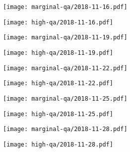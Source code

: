 \documentclass{article}
\begin{document}
\begin{figure}[H]
	\ContinuedFloat
	\centering
	\begin{subfigure}{0.48\linewidth}
		\texttt{[image: marginal-qa/2018-11-16.pdf]}
	\end{subfigure}
	\begin{subfigure}{0.48\linewidth}
		\texttt{[image: high-qa/2018-11-16.pdf]}
	\end{subfigure}
	\begin{subfigure}{0.48\linewidth}
		\texttt{[image: marginal-qa/2018-11-19.pdf]}
	\end{subfigure}
	\begin{subfigure}{0.48\linewidth}
		\texttt{[image: high-qa/2018-11-19.pdf]}
	\end{subfigure}
	\begin{subfigure}{0.48\linewidth}
		\texttt{[image: marginal-qa/2018-11-22.pdf]}
	\end{subfigure}
	\begin{subfigure}{0.48\linewidth}
		\texttt{[image: high-qa/2018-11-22.pdf]}
	\end{subfigure}
	\begin{subfigure}{0.48\linewidth}
		\texttt{[image: marginal-qa/2018-11-25.pdf]}
	\end{subfigure}
	\begin{subfigure}{0.48\linewidth}
		\texttt{[image: high-qa/2018-11-25.pdf]}
	\end{subfigure}
	\begin{subfigure}{0.48\linewidth}
		\texttt{[image: marginal-qa/2018-11-28.pdf]}
	\end{subfigure}
	\begin{subfigure}{0.48\linewidth}
		\texttt{[image: high-qa/2018-11-28.pdf]}
	\end{subfigure}
\end{figure}
\end{document}
